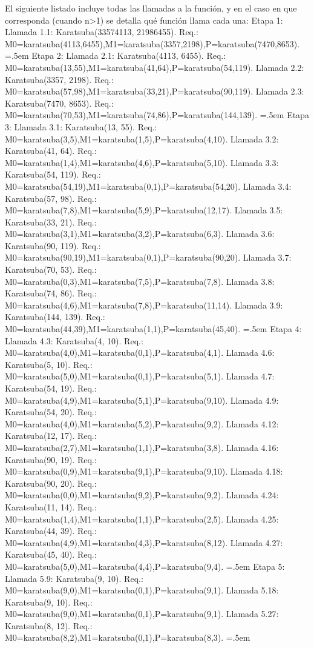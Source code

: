 \documentclass[titlepage,a4paper]{article}
\newenvironment{lcverbatim}
 {\SaveVerbatim{cverb}}
 {\endSaveVerbatim
  \flushleft\fboxrule=0pt\fboxsep=.5em
  \colorbox{cverbbg}{%
    \makebox[\dimexpr\linewidth-2\fboxsep][l]{\BUseVerbatim{cverb}}%
  }
  \endflushleft
}
\begin{document}
El siguiente listado incluye todas las llamadas a la función, y en el caso en que corresponda (cuando n>1) se detalla qué función llama cada una:
\begin{lcverbatim}
Etapa 1:
	Llamada 1.1: Karatsuba(33574113, 21986455). Req.:
		M0=karatsuba(4113,6455),M1=karatsuba(3357,2198),P=karatsuba(7470,8653).
\end{lcverbatim}
\begin{lcverbatim}
Etapa 2:
	Llamada 2.1: Karatsuba(4113, 6455). Req.:
		M0=karatsuba(13,55),M1=karatsuba(41,64),P=karatsuba(54,119).
	Llamada 2.2: Karatsuba(3357, 2198). Req.:
		M0=karatsuba(57,98),M1=karatsuba(33,21),P=karatsuba(90,119).
	Llamada 2.3: Karatsuba(7470, 8653). Req.:
		M0=karatsuba(70,53),M1=karatsuba(74,86),P=karatsuba(144,139).
\end{lcverbatim}
\begin{lcverbatim}
Etapa 3:
	Llamada 3.1: Karatsuba(13, 55). Req.:
		M0=karatsuba(3,5),M1=karatsuba(1,5),P=karatsuba(4,10).
	Llamada 3.2: Karatsuba(41, 64). Req.:
		M0=karatsuba(1,4),M1=karatsuba(4,6),P=karatsuba(5,10).
	Llamada 3.3: Karatsuba(54, 119). Req.:
		M0=karatsuba(54,19),M1=karatsuba(0,1),P=karatsuba(54,20).
	Llamada 3.4: Karatsuba(57, 98). Req.:
		M0=karatsuba(7,8),M1=karatsuba(5,9),P=karatsuba(12,17).
	Llamada 3.5: Karatsuba(33, 21). Req.:
		M0=karatsuba(3,1),M1=karatsuba(3,2),P=karatsuba(6,3).
	Llamada 3.6: Karatsuba(90, 119). Req.:
		M0=karatsuba(90,19),M1=karatsuba(0,1),P=karatsuba(90,20).
	Llamada 3.7: Karatsuba(70, 53). Req.:
		M0=karatsuba(0,3),M1=karatsuba(7,5),P=karatsuba(7,8).
	Llamada 3.8: Karatsuba(74, 86). Req.:
		M0=karatsuba(4,6),M1=karatsuba(7,8),P=karatsuba(11,14).
	Llamada 3.9: Karatsuba(144, 139). Req.:
		M0=karatsuba(44,39),M1=karatsuba(1,1),P=karatsuba(45,40).
\end{lcverbatim}
\begin{lcverbatim}
Etapa 4:
	Llamada 4.3: Karatsuba(4, 10). Req.:
		M0=karatsuba(4,0),M1=karatsuba(0,1),P=karatsuba(4,1).
	Llamada 4.6: Karatsuba(5, 10). Req.:
		M0=karatsuba(5,0),M1=karatsuba(0,1),P=karatsuba(5,1).
	Llamada 4.7: Karatsuba(54, 19). Req.:
		M0=karatsuba(4,9),M1=karatsuba(5,1),P=karatsuba(9,10).
	Llamada 4.9: Karatsuba(54, 20). Req.:
		M0=karatsuba(4,0),M1=karatsuba(5,2),P=karatsuba(9,2).
	Llamada 4.12: Karatsuba(12, 17). Req.:
		M0=karatsuba(2,7),M1=karatsuba(1,1),P=karatsuba(3,8).
	Llamada 4.16: Karatsuba(90, 19). Req.:
		M0=karatsuba(0,9),M1=karatsuba(9,1),P=karatsuba(9,10).
	Llamada 4.18: Karatsuba(90, 20). Req.:
		M0=karatsuba(0,0),M1=karatsuba(9,2),P=karatsuba(9,2).
	Llamada 4.24: Karatsuba(11, 14). Req.:
		M0=karatsuba(1,4),M1=karatsuba(1,1),P=karatsuba(2,5).
	Llamada 4.25: Karatsuba(44, 39). Req.:
		M0=karatsuba(4,9),M1=karatsuba(4,3),P=karatsuba(8,12).
	Llamada 4.27: Karatsuba(45, 40). Req.:
		M0=karatsuba(5,0),M1=karatsuba(4,4),P=karatsuba(9,4).
\end{lcverbatim}
\begin{lcverbatim}
Etapa 5:
	Llamada 5.9: Karatsuba(9, 10). Req.:
		M0=karatsuba(9,0),M1=karatsuba(0,1),P=karatsuba(9,1).
	Llamada 5.18: Karatsuba(9, 10). Req.:
		M0=karatsuba(9,0),M1=karatsuba(0,1),P=karatsuba(9,1).
	Llamada 5.27: Karatsuba(8, 12). Req.:
		M0=karatsuba(8,2),M1=karatsuba(0,1),P=karatsuba(8,3).
\end{lcverbatim}
\end{document}
